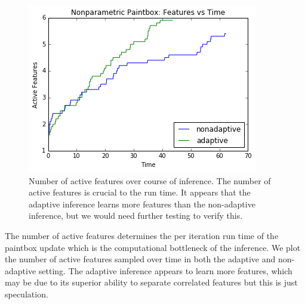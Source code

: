 \documentclass{article}
\begin{document}
\begin{figure}[ht]
\vskip 0.2in
\begin{center}
\centerline{\includegraphics[width=\columnwidth]{f_t}}
\caption{Number of active features over course of inference.  The number of active features is crucial to the run time.  It appears that the adaptive inference learns more features than the non-adaptive inference, but we would need further testing to verify this.}
\label{f_t}
\end{center}
\vskip -0.2in
\end{figure}

The number of active features determines the per iteration run time of the paintbox update which is the computational bottleneck of the inference.  We plot the number of active features sampled over time in both the adaptive and non-adaptive setting.  The adaptive inference appears to learn more features, which may be due to its superior ability to separate correlated features but this is just speculation.  
\end{document}
